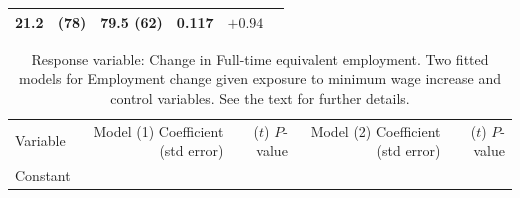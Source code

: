 \documentclass[11pt,a4paper,openany]{book}
\begin{document}
\begin{longtable}[]{@{}lrrrcc@{}}
\begin{minipage}[t]{0.04\columnwidth}
21.2\strut
\end{minipage} & \begin{minipage}[t]{0.05\columnwidth}\raggedleft\strut
(78)\strut
\end{minipage} & \begin{minipage}[t]{0.29\columnwidth}\raggedleft\strut
79.5 (62)\strut
\end{minipage} & \begin{minipage}[t]{0.10\columnwidth}\centering\strut
0.117\strut
\end{minipage} & \begin{minipage}[t]{0.08\columnwidth}\centering\strut
\(+0.94\)\strut
\end{minipage}\tabularnewline
\bottomrule
\end{longtable}

\begin{longtable}[]{@{}lrrrr@{}}
\caption{\label{tab:t-fastfood-models} Response variable: Change in
Full-time equivalent employment. Two fitted models for Employment change
given exposure to minimum wage increase and control variables. See the
text for further details.}\tabularnewline
\toprule
\begin{minipage}[t]{0.31\columnwidth}\raggedright\strut
Variable\strut
\end{minipage} & \begin{minipage}[t]{0.19\columnwidth}\raggedleft\strut
Model (1) Coefficient (std error)\strut
\end{minipage} & \begin{minipage}[t]{0.19\columnwidth}\raggedleft\strut
(\(t\)) \(P\)-value\strut
\end{minipage} & \begin{minipage}[t]{0.08\columnwidth}\raggedleft\strut
Model (2) Coefficient (std error)\strut
\end{minipage} & \begin{minipage}[t]{0.06\columnwidth}\raggedleft\strut
(\(t\)) \(P\)-value\strut
\end{minipage}\tabularnewline
\begin{minipage}[t]{0.31\columnwidth}\raggedright\strut
Constant\strut
\end{minipage} & \begin{minipage}[t]{0.19\columnwidth}\raggedleft\strut
\strut
\end{minipage} & \begin{minipage}[t]{0.19\columnwidth}\raggedleft\strut
\strut
\end{minipage} & \begin{minipage}[t]{0.08\columnwidth}\raggedleft\strut

\end{minipage}
\end{longtable}
\end{document}
